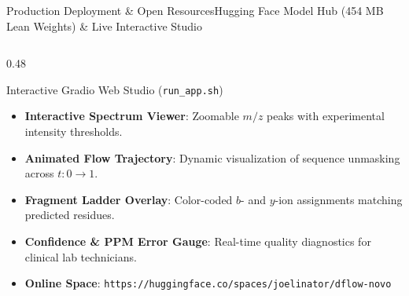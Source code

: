 \documentclass[aspectratio=169, 10pt]{beamer}
\begin{document}
\begin{frame}{Production Deployment \& Open Resources}{Hugging Face Model Hub (454 MB Lean Weights) \& Live Interactive Studio}
\begin{columns}[T]
\begin{column}{0.48\textwidth}
  \begin{block}{\scriptsize Interactive Gradio Web Studio (\texttt{run\_app.sh})}
    \begin{itemize}\setlength{\itemsep}{2pt}\tiny
      \item \textbf{Interactive Spectrum Viewer}: Zoomable $m/z$ peaks with experimental intensity thresholds.
      \item \textbf{Animated Flow Trajectory}: Dynamic visualization of sequence unmasking across $t: 0 \to 1$.
      \item \textbf{Fragment Ladder Overlay}: Color-coded $b$- and $y$-ion assignments matching predicted residues.
      \item \textbf{Confidence \& PPM Error Gauge}: Real-time quality diagnostics for clinical lab technicians.
      \item \textbf{Online Space}: \texttt{https://huggingface.co/spaces/joelinator/dflow-novo}
    \end{itemize}
  \end{block}
  \vspace{0.05cm}
\end{column}
\end{columns}
\end{frame}
\end{document}
